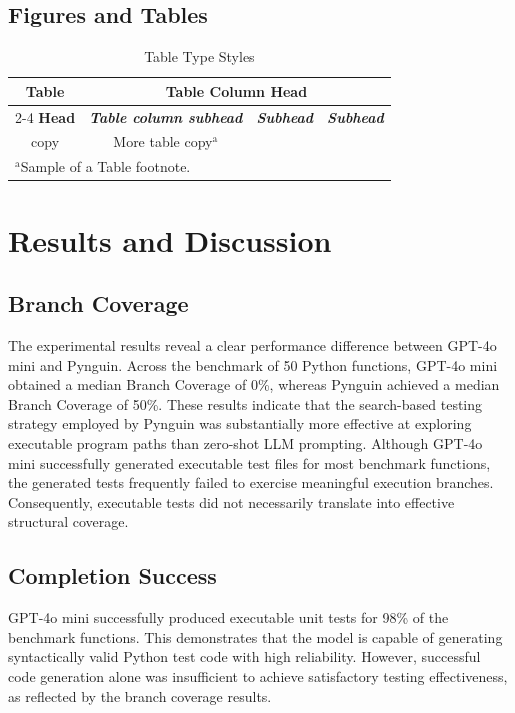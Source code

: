 \documentclass[conference]{IEEEtran}
\begin{document}
\subsection{Figures and Tables}
\begin{table}[htbp]
\caption{Table Type Styles}
\begin{center}
\begin{tabular}{|c|c|c|c|}
\hline
\textbf{Table}&\multicolumn{3}{|c|}{\textbf{Table Column Head}} \\
\cline{2-4}
\textbf{Head} & \textbf{\textit{Table column subhead}}& \textbf{\textit{Subhead}}& \textbf{\textit{Subhead}} \\
\hline
copy& More table copy$^{\mathrm{a}}$& &  \\
\hline
\multicolumn{4}{l}{$^{\mathrm{a}}$Sample of a Table footnote.}
\end{tabular}
\label{tab1}
\end{center}
\end{table}
\section{Results and Discussion}
\subsection{Branch Coverage}
The experimental results reveal a clear performance difference between GPT-4o mini and Pynguin.
Across the benchmark of 50 Python functions, GPT-4o mini obtained a median Branch Coverage of 0\%, whereas Pynguin achieved a median Branch Coverage of 50\%. These results indicate that the search-based testing strategy employed by Pynguin was substantially more effective at exploring executable program paths than zero-shot LLM prompting.
Although GPT-4o mini successfully generated executable test files for most benchmark functions, the generated tests frequently failed to exercise meaningful execution branches. Consequently, executable tests did not necessarily translate into effective structural coverage.
\subsection{Completion Success}
GPT-4o mini successfully produced executable unit tests for 98\% of the benchmark functions. This demonstrates that the model is capable of generating syntactically valid Python test code with high reliability. However, successful code generation alone was insufficient to achieve satisfactory testing effectiveness, as reflected by the branch coverage results.
\end{document}
